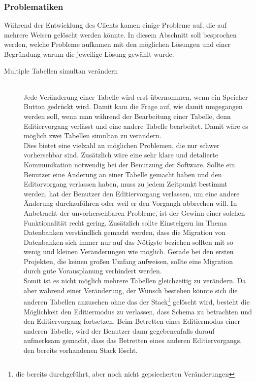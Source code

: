 \subsubsection{Problematiken}
\label{subsubsec04:problematik}

Während der Entwicklung des Clients kamen einige Probleme auf, die auf mehrere Weisen gelöscht werden könnte. In diesem Abschnitt soll besprochen werden, welche Probleme aufkamen mit den möglichen Lösungen und einer Begründung warum die jeweilige Lösung gewählt wurde.

\begin{description}
\item[Multiple Tabellen simultan verändern] \hfill\\
Jede Veränderung einer Tabelle wird erst übernommen, wenn ein Speicher-Button gedrückt wird. Damit kam die Frage auf, wie damit umgegangen werden soll, wenn man während der Bearbeitung einer Tabelle, denn Editiervorgang verlässt und eine andere Tabelle bearbeitet.
Damit wäre es möglich zwei Tabellen simultan zu verändern. \\
Dies bietet eine vielzahl an möglichen Problemen, die nur schwer vorhersehbar sind. Zusätzlich wäre eine sehr klare und detalierte Kommunikation notwendig bei der Benutzung der Software. Sollte ein Benutzer eine Änderung an einer Tabelle gemacht haben und den Editorvorgang verlassen haben, muss zu jedem Zeitpunkt bestimmt werden, hat der Benutzer den Editiervorgang verlassen, um eine andere Änderung durchzuführen oder weil er den Vorgangh abbrechen will. In Anbetracht der unvorhersehbaren Probleme, ist der Gewinn einer solchen Funktionalität recht gering. Zusätzlich sollte Einsteigern im Thema Datenbanken verständlich gemacht werden, dass die Migration von Datenbanken sich immer nur auf das Nötigste beziehen sollten mit so wenig und kleinen Veränderungen wie möglich. Gerade bei den ersten Projekten, die keinen großen Umfang aufweisen, sollte eine Migration durch gute Vorausplanung verhindert werden. \\
Somit ist es nicht möglich mehrere Tabellen gleichzeitig zu verändern. Da aber während einer Veränderung, der Wunsch bestehen könnte sich die anderen Tabellen anzusehen ohne das der Stack\footnote{die bereits durchgeführt, aber noch nicht gepsiecherten Veränderungen} gelöscht wird, besteht die Möglichkeit den Editiermodus zu verlassen, dass Schema zu betrachten und den Editiervorgang fortsetzen. Beim Betretten eines Editiermodus einer anderen Tabelle, wird der Benutzer dann gegebenenfalls darauf aufmerksam gemacht, dass das Betretten eines anderen Editiervorgangs, den bereits vorhandenen Stack löscht.


\end{description}
